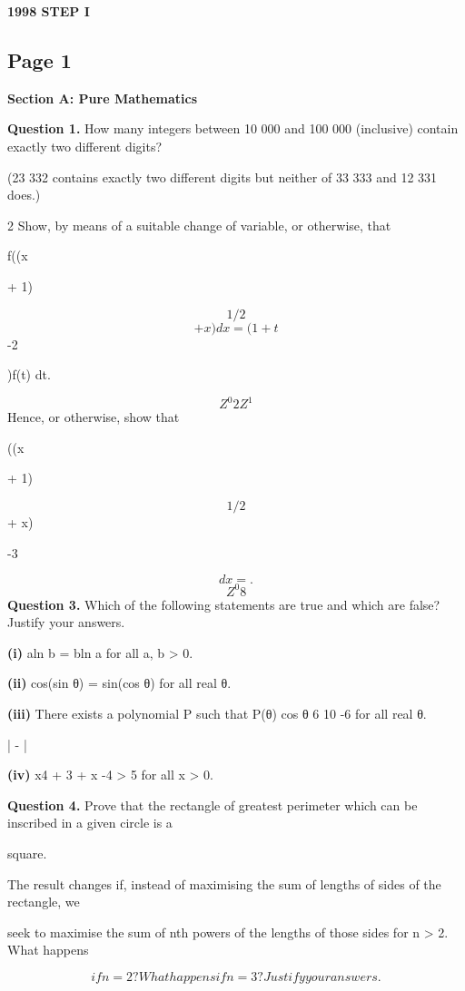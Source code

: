 \documentclass[12pt]{article}
\begin{document}
\begin{center}
{\Large \textbf{1998 STEP I}}
\end{center}

\subsection*{Page 1}
\begin{flushleft}
\bigskip\textbf{Section A: Pure Mathematics}\par
\bigskip\textbf{Question 1.} How many integers between 10 000 and 100 000 (inclusive) contain exactly two different digits?\par
(23 332 contains exactly two different digits but neither of 33 333 and 12 331 does.)\par
2 Show, by means of a suitable change of variable, or otherwise, that\par
\infty \infty\par
f((x\par
+ 1)\par
\[1/2\]
\[+ x) dx = (1 + t\]
-2\par
)f(t) dt.\par
\[Z^0 2 Z^1\]
Hence, or otherwise, show that\par
\infty\par
((x\par
+ 1)\par
\[1/2\]
+ x)\par
-3\par
\[dx = .\]
\[Z^0 8\]
\bigskip\textbf{Question 3.} Which of the following statements are true and which are false? Justify your answers.\par
\textbf{(i)} aln b = bln a for all a, b > 0.\par
\textbf{(ii)} cos(sin θ) = sin(cos θ) for all real θ.\par
\textbf{(iii)} There exists a polynomial P such that P(θ) cos θ 6 10 -6 for all real θ.\par
| - |\par
\textbf{(iv)} x4 + 3 + x -4 > 5 for all x > 0.\par
\bigskip\textbf{Question 4.} Prove that the rectangle of greatest perimeter which can be inscribed in a given circle is a\par
square.\par
The result changes if, instead of maximising the sum of lengths of sides of the rectangle, we\par
seek to maximise the sum of nth powers of the lengths of those sides for n > 2. What happens\par
\[if n = 2? What happens if n = 3? Justify your answers.\]
\end{flushleft}
\end{document}
